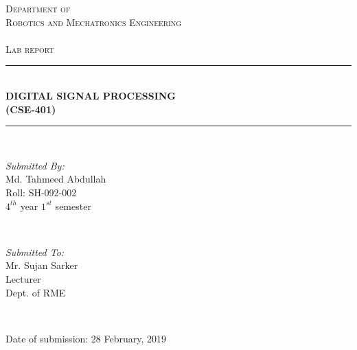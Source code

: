 \documentclass[a4paper,11pt]{article}
\begin{document}
	\begin{titlepage}
		
		\newcommand{\HRule}{\rule{\linewidth}{0.5mm}} %
		
		\center %
		
		
		
		\textsc{\LARGE Department of  }\\[0.3cm] %
		\textsc{\LARGE Robotics and Mechatronics Engineering  }\\[0.3cm]
		\textsc{\Large   }\\[0.3cm]
		\textsc{\Large Lab report }\\[0.5cm] %
		
		\HRule \\[0.4cm]
		{ \huge \bfseries DIGITAL SIGNAL PROCESSING}\\[0.4cm]  
		
		{ \huge \bfseries (CSE-401)}\\[0.03cm]
		\HRule \\[5cm]
		
		
		
		\begin{minipage}{0.4\textwidth}
			\begin{flushleft} \large
				\emph{Submitted By:}\\
				Md. Tahmeed Abdullah \\Roll: SH-092-002\\$4^{th}$ year $1^{st}$ semester %
			\end{flushleft}
		\end{minipage}
		~
		\begin{minipage}{0.4\textwidth}
			\begin{flushright} \large
				\emph{Submitted To:} \\
				Mr. Sujan Sarker\\Lecturer\\Dept. of RME %
			\end{flushright}
		\end{minipage}\\[1cm]
		
	
		
		\vfill
		
		{\LARGE Date of submission: 28 February, 2019 }\\[1cm] 
		
		
		
	\end{titlepage}
	\begin{center}
		
	\end{center}
	
\end{document}
